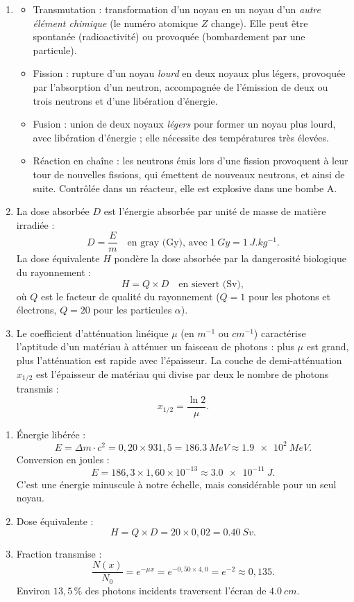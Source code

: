 \documentclass[11pt]{article}
\newcommand{\cle}[1]{{\popxbold\color{popdark}#1}}
\begin{document}
\begin{corrige}
\begin{enumerate}
\item \begin{itemize}
\item \cle{Transmutation} : transformation d'un noyau en un noyau d'un \emph{autre élément chimique} (le numéro atomique $Z$ change). Elle peut être spontanée (radioactivité) ou provoquée (bombardement par une particule).
\item \cle{Fission} : rupture d'un noyau \emph{lourd} en deux noyaux plus légers, provoquée par l'absorption d'un neutron, accompagnée de l'émission de deux ou trois neutrons et d'une libération d'énergie.
\item \cle{Fusion} : union de deux noyaux \emph{légers} pour former un noyau plus lourd, avec libération d'énergie ; elle nécessite des températures très élevées.
\item \cle{Réaction en chaîne} : les neutrons émis lors d'une fission provoquent à leur tour de nouvelles fissions, qui émettent de nouveaux neutrons, et ainsi de suite. Contrôlée dans un réacteur, elle est explosive dans une bombe A.
\end{itemize}
\item La \cle{dose absorbée} $D$ est l'énergie absorbée par unité de masse de matière irradiée :
\[ D = \frac{E}{m} \quad \text{en gray (Gy), avec } \SI{1}{Gy} = \SI{1}{J.kg^{-1}}. \]
La \cle{dose équivalente} $H$ pondère la dose absorbée par la dangerosité biologique du rayonnement :
\[ H = Q \times D \quad \text{en sievert (Sv)}, \]
où $Q$ est le facteur de qualité du rayonnement ($Q = 1$ pour les photons et électrons, $Q = 20$ pour les particules $\alpha$).
\item Le \cle{coefficient d'atténuation linéique} $\mu$ (en $\si{m^{-1}}$ ou $\si{cm^{-1}}$) caractérise l'aptitude d'un matériau à atténuer un faisceau de photons : plus $\mu$ est grand, plus l'atténuation est rapide avec l'épaisseur. La \cle{couche de demi-atténuation} $x_{1/2}$ est l'épaisseur de matériau qui divise par deux le nombre de photons transmis :
\[ x_{1/2} = \frac{\ln 2}{\mu}. \]
\end{enumerate}
\end{corrige}

\begin{corrige}
\begin{enumerate}
\item Énergie libérée :
\[ E = \Delta m \cdot c^2 = 0,20 \times 931,5 = \SI{186,3}{MeV} \approx \SI{1,9e2}{MeV}. \]
Conversion en joules :
\[ E = 186,3 \times 1,60\times 10^{-13} \approx \SI{3,0e-11}{J}. \]
C'est une énergie minuscule à notre échelle, mais considérable pour un seul noyau.
\item Dose équivalente :
\[ H = Q \times D = 20 \times 0,02 = \SI{0,40}{Sv}. \]
\item Fraction transmise :
\[ \frac{N(x)}{N_0} = e^{-\mu x} = e^{-0,50 \times 4,0} = e^{-2} \approx 0,135. \]
Environ $13,5\,\%$ des photons incidents traversent l'écran de $\SI{4,0}{cm}$.
\end{enumerate}
\end{corrige}
\end{document}
